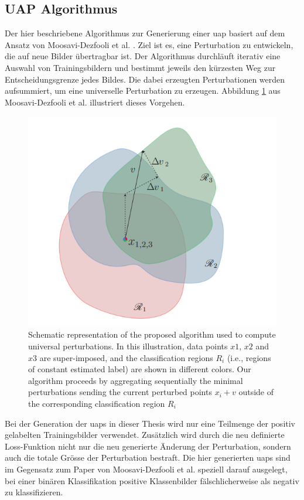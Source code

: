 \subsection{UAP Algorithmus} \label{chap:UAP}
Der hier beschriebene Algorithmus zur Generierung einer \acrlong{uap} basiert auf dem Ansatz von Moosavi-Dezfooli et al. \cite{moosavi-dezfooli_universal_2017}. Ziel ist es, eine Perturbation zu entwickeln, die auf neue Bilder übertragbar ist. Der Algorithmus durchläuft iterativ eine Auswahl von Trainingsbildern und bestimmt jeweils den kürzesten Weg zur Entscheidungsgrenze jedes Bildes. Die dabei erzeugten Perturbationen werden aufsummiert, um eine universelle Perturbation zu erzeugen. Abbildung \ref{fig:uap-paper-figure2} aus Moosavi-Dezfooli et al. \cite{moosavi-dezfooli_universal_2017} illustriert dieses Vorgehen.

\begin{figure}[H]
    \centering
    \includegraphics[width=0.6\linewidth]{01-images/04-methodik/UAP-figure2.png}
    \caption{Schematic representation of the proposed algorithm used to compute universal perturbations. In this illustration, data points $x1$, $x2$ and $x3$ are super-imposed, and the classification regions $R_{i}$ (i.e., regions of constant estimated label) are shown in different colors. Our algorithm proceeds by aggregating sequentially the minimal perturbations sending the current perturbed points $x_{i} + v$ outside of the corresponding classification region $R_{i}$ \cite{moosavi-dezfooli_universal_2017}}
    \label{fig:uap-paper-figure2}
\end{figure}

Bei der Generation der \acrshort{uap}s in dieser Thesis wird nur eine Teilmenge der positiv gelabelten Trainingsbilder verwendet. Zusätzlich wird durch die neu definierte Loss-Funktion nicht nur die neu generierte Änderung der Perturbation, sondern auch die totale Grösse der Perturbation bestraft. Die hier generierten \acrshort{uap}s sind im Gegensatz zum Paper von Moosavi-Dezfooli et al. \cite{moosavi-dezfooli_universal_2017} speziell darauf ausgelegt, bei einer binären Klassifikation positive Klassenbilder fälschlicherweise als negativ zu klassifizieren. 


